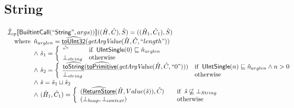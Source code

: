 \subsection{String}
\[
\begin{array}{l}
\aI _{cp}\lbr \SF{BuiltintCall}(``\SF{String}",args))\rbr((\hat{H},\hat{C}), \hat{S})
  = ((\hat{H}_1, \hat{C}_1), \hat{S})\\
\quad\wherec{
  \hat{n}_{arglen} = \ahf{toUInt32}(\hf{getArgValue}(\hat{H}, \hat{C}, ``length"))\\
   \land\ \hat{s}_1 = \left\{\begin{array}{ll}
       \hat{``"}
       & \ifc{\SF{UIntSingle}(0) \sqsubseteq \hat{n}_{arglen}}\\
     \bot_{string}& \owc
     \end{array}\right.\\
  \land\ \hat{s}_2 = \left\{\begin{array}{ll}
       \ahf{toString}(\ahf{toPrimitive}(\hf{getArgValue}(\hat{H}, \hat{C}, ``0")))
       & \ifc{\SF{UIntSingle}(n) \sqsubseteq \hat{n}_{arglen} \land n > 0}\\
     \bot_{string}& \owc
     \end{array}\right.\\
  \land\ \hat{s} = \hat{s}_1 \sqcup \hat{s}_2\\
  \land\ (\hat{H}_1, \hat{C}_1) = 
    \left\{\begin{array}{l@{\quad\quad}l}
      (\ahf{ReturnStore}(\hat{H}, Value(\hat{s})), \hat{C})
      & \ifc{\hat{s} \not\sqsubseteq \bot_{String}}\\
      (\bot_{heap}, \bot_{context}) & \owc \\
    \end{array}\right.\\
  }\\
\\\\



\end{array}\]
